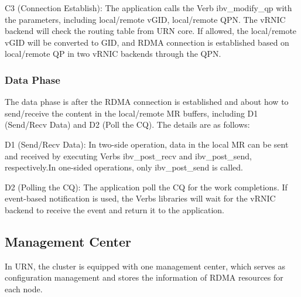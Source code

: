 C3 (Connection Establish): The application calls the Verb ibv\_modify\_qp with the parameters, including local/remote vGID, local/remote QPN. The vRNIC backend will check the routing table from URN core. If allowed, the local/remote vGID will be converted to GID, and RDMA connection is established based on local/remote QP in two vRNIC backends through the QPN. 

\subsubsection{Data Phase}
The data phase is after the RDMA connection is established and about how to send/receive the content in the local/remote MR buffers, including D1 (Send/Recv Data) and D2 (Poll the CQ). The details are as follows:

D1 (Send/Recv Data): In two-side operation, data in the local MR can be sent and received by executing Verbs ibv\_post\_recv and ibv\_post\_send, respectively.In one-sided operations, only ibv\_post\_send is called.

D2 (Polling the CQ): The application poll the CQ for the work completions. If event-based notification is used, the Verbs libraries will wait for the vRNIC backend to receive the event and return it to the application.

\subsection{Management Center}

In URN, the cluster is equipped with one management center, which serves as configuration management and stores the information of RDMA resources for each node.

